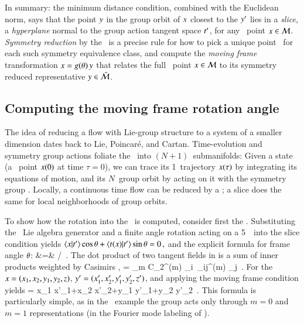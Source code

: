 \documentclass[preprint,12pt]{elsarticle} %
\begin{document}
In summary: the minimum distance condition, combined with the Euclidean
norm, says that the point $y$ in the group orbit of $x$ closest
to the {\template} ${y'}$ lies in a \emph{slice}, a {\em hyperplane}
normal to the group action tangent space $t'_{}$, for any \statesp\
point $x \in {\cal M}$. {\em Symmetry reduction} by the \mframes\ is a
precise rule for how to pick a unique point \sspRed\ for each such
symmetry equivalence class, and compute the \emph{moving frame}
transformation $x =g({\bf \theta})\, y$ that relates the full
\statesp\ point  $x \in {\cal M}$ to its symmetry reduced representative
$y \in \bar{\cal M}$.


\subsection{Computing the moving frame rotation angle}
\label{exam:CLErotAngle}

															\toCB
The idea of reducing a flow with Lie-group structure to a system of a
smaller dimension dates back to Lie, Poincar\'e, and Cartan.
Time-evolution and symmetry group actions foliate the \statesp\ into
$(N\!+\!1)$\dmn\ submanifolds: Given a state (a \statesp\ point $x(0)$
at time $\tau=0$), we can trace its  1\dmn\ trajectory $x(\tau)$ by
integrating its equations of motion, and its $N$\dmn\ group orbit by
acting on it with the symmetry group \Group. Locally, a continuous time
flow can be reduced by a \PoincSec; a slice does the same for local
neighborhoods of group orbits.

To show how the rotation into the \slice\ is computed, consider first the
\cLe. Substituting the \ Lie algebra
generator and a finite angle \SOn{2} rotation  acting on a
5\dmn\ \statesp\ into the slice condition \refeq{PCsectQ}
yields
\(\braket{\ssp}{\sliceTan{}}\cos\gSpace
    +\braket{\groupTan_{}(\ssp)}{\sliceTan{}} \sin\gSpace
= 0
\,,
\)
and the explicit formula for frame angle ${\bf \theta}$:
\bea
\tan\gSpace &=&
   {\braket{\ssp}{\sliceTan{}}}/
          {\braket{\groupTan_{}(\ssp)}{\sliceTan{}}}
\,.
\label{SL:CLEsliceRot}
\eea
The dot product of two tangent fields in  is a
sum of inner products weighted by Casimirs \refeq{QuadCasimir},
\beq
\braket{\groupTan(\sspRed)}{\groupTan(\slicep)}
   = \sum_m C_2^{(m)} {\sspRed}_i\, \delta_{ij}^{(m)} \slicep_j
\,.
For the \cLe\
$x = (x_1,x_2,y_1,y_2,z)$,
${y'} = (x_1',x_2',y_1',y_2',z')$,
and applying the moving frame condition  yields
\beq
\tan\gSpace =
       {x_1 x'_1+x_2 x'_2+y_1 y'_1+y_2 y'_2}
\,.
This formula is particularly simple, as in the \cLe\
example the group acts only through $m=0$ and $m=1$ representations
(in the Fourier mode labeling of ).
\end{document}
